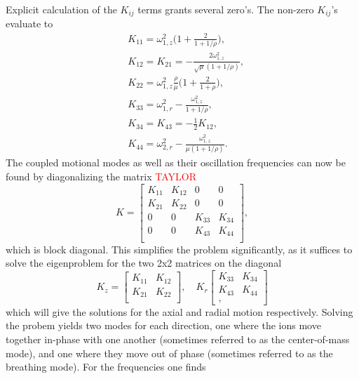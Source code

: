 Explicit calculation of the $K_{ij}$ terms grants several zero's. The non-zero $K_{ij}$'s evaluate to
\begin{align}
    &K_{11} = \omega_{1,z}^2\bigg(1+\frac{2}{1+1/\rho}\bigg),\\
    &K_{12} = K_ {21} = -\frac{2\omega_{1,z}^2}{\sqrt{\mu}(1+1/\rho)},\\
    &K_{22} = \omega_{1,z}^2\frac{\rho}{\mu}\bigg(1+\frac{2}{1+\rho}\bigg),\\
    &K_{33} = \omega_{1,r}^2 - \frac{\omega_{1,z}^2}{1+1/\rho},\\
    &K_{34} = K_{43} = -\frac{1}{2}K_{12},\\
    &K_{44} = \omega_{2,r}^2-\frac{\omega_{1,z}^2}{\mu(1+1/\rho)}.
\end{align}
The coupled motional modes as well as their oscillation frequencies can now be found by diagonalizing the matrix \textcolor{red}{TAYLOR}
\begin{equation}
    K = \begin{bmatrix}
        K_{11} & K_{12} & 0 & 0\\
        K_{21} & K_{22} & 0 & 0\\
        0 & 0 & K_{33} & K_{34}\\
        0 & 0 & K_{43} & K_{44}\\
    \end{bmatrix},
\end{equation}
which is block diagonal. This simplifies the problem significantly, as it suffices to solve the eigenproblem for the two 2x2 matrices on the diagonal
\begin{equation}
    K_{z} = \begin{bmatrix}
        K_{11} & K_{12}\\
        K_{21} & K_{22}\\
    \end{bmatrix},
    \quad
    K_{r}
    \begin{bmatrix}
        K_{33} & K_{34}\\
        K_{43} & K_{44}\\,
    \end{bmatrix}
\end{equation}
which will give the solutions for the axial and radial motion respectively.
Solving the probem yields two modes for each direction, one where the ions move together in-phase with one another (sometimes referred to as the center-of-mass mode), and one where they move out of phase (sometimes referred to as the breathing mode).
For the frequencies one finds
